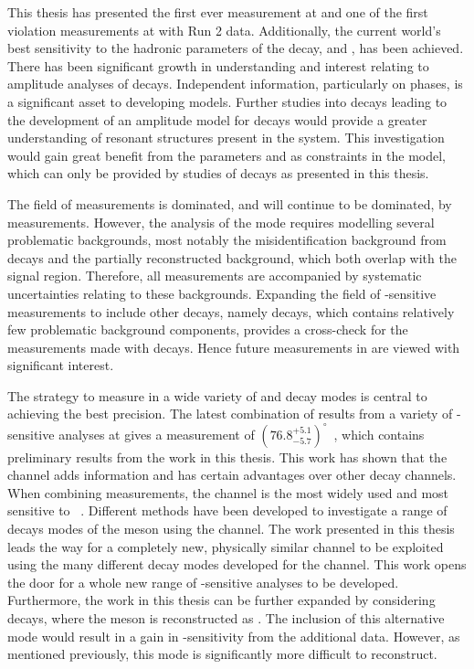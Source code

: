 This thesis has presented the first ever \btodkst measurement at \lhcb and one of the first \CP violation measurements at \lhcb with Run 2 data. Additionally, the current world's best sensitivity to the hadronic parameters of the \Bm decay, \rb and \deltab, has been achieved. There has been significant growth in understanding and interest relating to amplitude analyses of \B decays. Independent information, particularly on phases, is a significant asset to developing models. Further studies into \btodkst decays leading to the development of an amplitude model for \decay{\Bm}{\D\KS\pim} decays would provide a greater understanding of resonant structures present in the \KS\pim system. This investigation would gain great benefit from the parameters \rb and \deltab as constraints in the model, which can only be provided by studies of \btodkst decays as presented in this thesis. 

The field of \Pgamma measurements is dominated, and will continue to be dominated, by \decay{\Bm}{\D\Km} measurements. However, the analysis of the \decay{\Bm}{\D\Km} mode requires modelling several problematic backgrounds, most notably the misidentification background from \decay{\Bm}{\D\pim} decays and the partially reconstructed background, which both overlap with the signal region. Therefore, all \decay{\Bm}{\D\Km} measurements are accompanied by systematic uncertainties relating to these backgrounds. Expanding the field of \Pgamma-sensitive measurements to include other \Bm decays, namely \decay{\Bm}{\D\Kstarm} decays, which contains relatively few problematic background components, provides a cross-check for the \Pgamma measurements made with \decay{\Bm}{\D\Km} decays. Hence future measurements in \decay{\Bm}{\D\Kstarm} are viewed with significant interest.

The strategy to measure \Pgamma in a wide variety of \B and \D decay modes is central to achieving the best precision. The latest combination of results from a variety of \Pgamma-sensitive analyses at \lhcb gives a measurement of $\left(76.8^{+5.1}_{-5.7}\right)^{\circ}$~\cite{LHCb-CONF-2017-004}, which contains preliminary results from the work in this thesis. This work has shown that the \btodkst channel adds information and has certain advantages over other decay channels. When combining \Pgamma measurements, the \decay{\Bm}{\D\Km} channel is the most widely used and most sensitive to \Pgamma~\cite{LHCb-CONF-2017-004}. Different methods have been developed to investigate a range of decays modes of the \Dz meson using the \decay{\Bm}{\D\Km} channel. The work presented in this thesis leads the way for a completely new, physically similar \decay{\Bm}{\D\Kstarm} channel to be exploited using the many different \D decay modes developed for the \decay{\Bm}{\D\Km} channel. This work opens the door for a whole new range of \Pgamma-sensitive analyses to be developed. Furthermore, the work in this thesis can be further expanded by considering \decay{\Bm}{\D\Kstarm} decays, where the \Kstarm meson is reconstructed as \Km\piz. The inclusion of this alternative mode would result in a gain in \Pgamma-sensitivity from the additional data. However, as mentioned previously, this mode is significantly more difficult to reconstruct.

